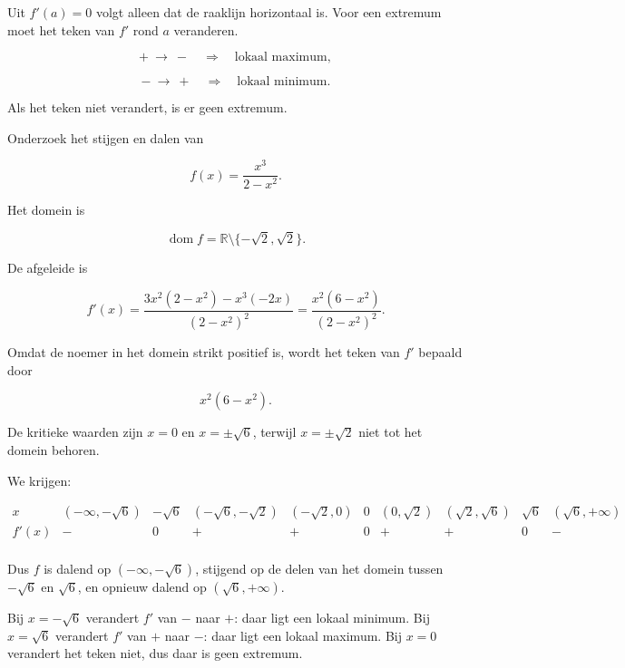 \documentclass{ximera}
\begin{document}
\begin{opmerking}
Uit \(f'(a)=0\) volgt alleen dat de raaklijn horizontaal is.
Voor een extremum moet het teken van \(f'\) rond \(a\) veranderen.

\[
+\ \to\ - \quad \Longrightarrow \quad \text{lokaal maximum},
\]

\[
-\ \to\ + \quad \Longrightarrow \quad \text{lokaal minimum}.
\]

Als het teken niet verandert, is er geen extremum.
\end{opmerking}

\begin{voorbeeld}
Onderzoek het stijgen en dalen van

\[f(x)=\frac{x^3}{2-x^2}.\]

Het domein is

\[\operatorname{dom}f=\mathbb{R}\setminus\{-\sqrt2,\sqrt2\}.\]

De afgeleide is

\[
f'(x)
=
\frac{3x^2(2-x^2)-x^3(-2x)}{(2-x^2)^2}
=
\frac{x^2(6-x^2)}{(2-x^2)^2}.
\]

Omdat de noemer in het domein strikt positief is, wordt het teken van
\(f'\) bepaald door

\[x^2(6-x^2).\]

De kritieke waarden zijn \(x=0\) en \(x=\pm\sqrt6\), terwijl
\(x=\pm\sqrt2\) niet tot het domein behoren.

We krijgen:

\[
\begin{array}{c|ccccccccc}
x & (-\infty,-\sqrt6) & -\sqrt6 &
(-\sqrt6,-\sqrt2) & (-\sqrt2,0) & 0 &
(0,\sqrt2) & (\sqrt2,\sqrt6) & \sqrt6 & (\sqrt6,+\infty)\\
\hline
f'(x) & - & 0 & + & + & 0 & + & + & 0 & -\\
\end{array}
\]

Dus \(f\) is dalend op \((-\infty,-\sqrt6)\), stijgend op de delen van
het domein tussen \(-\sqrt6\) en \(\sqrt6\), en opnieuw dalend op
\((\sqrt6,+\infty)\).

Bij \(x=-\sqrt6\) verandert \(f'\) van \(-\) naar \(+\): daar ligt een
lokaal minimum. Bij \(x=\sqrt6\) verandert \(f'\) van \(+\) naar \(-\):
daar ligt een lokaal maximum. Bij \(x=0\) verandert het teken niet, dus
daar is geen extremum.
\end{voorbeeld}

\end{document}
